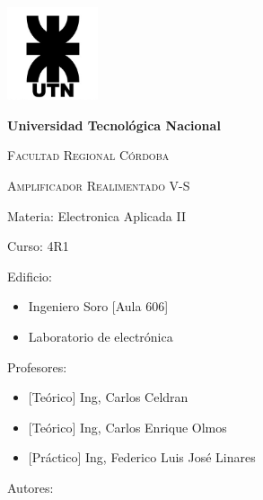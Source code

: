 \documentclass[12pt, letterpaper]{article}
\begin{document}
    \begin{titlepage}
        \centering %
        {\includegraphics[width=0.2\textwidth]{UTN_logo.jpg}\par}
        {\bfseries\LARGE Universidad Tecnológica Nacional \par}
        {\scshape\Large Facultad Regional Córdoba\par}
        \vspace{1cm}
        {\scshape\Huge Amplificador Realimentado V-S \par}%
        \raggedright %
        \vspace{1cm}
        {\Large Materia: Electronica Aplicada II \par}%
        \vspace{0.5cm}
        {\Large Curso: 4R1 \par}
        \vspace{0.5cm}
        {\Large Edificio: \par}%
            \begin{itemize}
                \item{\Large Ingeniero Soro [Aula 606] \par}
                \item{\Large Laboratorio de electrónica \par}
            \end{itemize}
        \vspace{0.5cm}
        {\Large Profesores: \par} %
            \begin{itemize}
                \item{\Large [Teórico] Ing, Carlos Celdran \par}
                \item{\Large [Teórico] Ing, Carlos Enrique Olmos \par}
                \item{\Large [Práctico] Ing, Federico Luis José Linares \par}
            \end{itemize}
        \vspace{0.5cm}
        {\Large Autores: \par} %

\end{titlepage}
\end{document}
